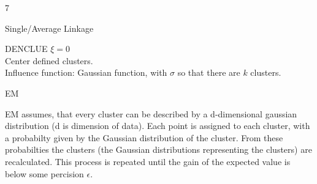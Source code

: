 \documentclass{article}
\begin{document}
\begin{ukon-infie}[12.12.17]{7}
\begin{exercise}[p=7]{Single/Average Linkage}
		\end{exercise}
		
		\begin{exercise}[p=2]{DENCLUE}
		$\xi=0$\\
		Center defined clusters.\\
		Influence function: Gaussian function, with $\sigma$ so that there are $k$ clusters.\\
		\end{exercise}
		
		\begin{exercise}[p=7]{EM}
		
		\question{}
		{
			EM assumes, that every cluster can be described by a d-dimensional gaussian distribution (d is dimension of data). Each point is assigned to each cluster, with a probabilty given by the Gaussian distribution of the cluster. From these probabilties the clusters (the Gaussian distributions representing the clusters) are recalculated. This process is repeated until the gain of the expected value is below some percision $\epsilon$.
		}
		

\end{exercise}
\end{ukon-infie}
\end{document}
